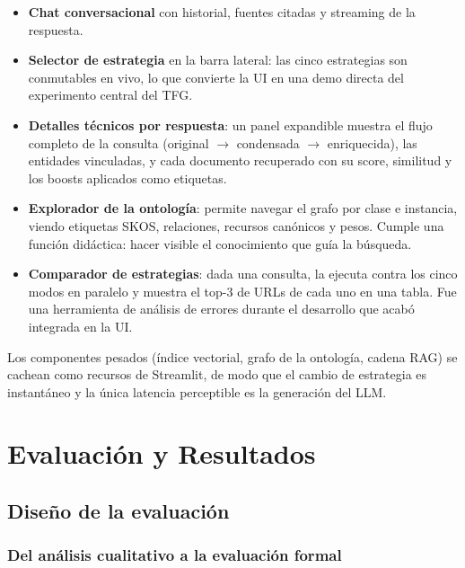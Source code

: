 \documentclass[12pt, a4paper, twoside]{report}
\begin{document}
\begin{itemize}
  \item \textbf{Chat conversacional} con historial, fuentes citadas y streaming de la respuesta.
  \item \textbf{Selector de estrategia} en la barra lateral: las cinco estrategias son conmutables en vivo, lo que convierte la UI en una demo directa del experimento central del TFG.
  \item \textbf{Detalles t\'ecnicos por respuesta}: un panel expandible muestra el flujo completo de la consulta (original $\rightarrow$ condensada $\rightarrow$ enriquecida), las entidades vinculadas, y cada documento recuperado con su score, similitud y los boosts aplicados como etiquetas.
  \item \textbf{Explorador de la ontolog\'ia}: permite navegar el grafo por clase e instancia, viendo etiquetas SKOS, relaciones, recursos can\'onicos y pesos. Cumple una funci\'on did\'actica: hacer visible el conocimiento que gu\'ia la b\'usqueda.
  \item \textbf{Comparador de estrategias}: dada una consulta, la ejecuta contra los cinco modos en paralelo y muestra el top-3 de URLs de cada uno en una tabla. Fue una herramienta de an\'alisis de errores durante el desarrollo que acab\'o integrada en la UI.
\end{itemize}

Los componentes pesados (\'indice vectorial, grafo de la ontolog\'ia, cadena RAG) se cachean como recursos de Streamlit, de modo que el cambio de estrategia es instant\'aneo y la \'unica latencia perceptible es la generaci\'on del LLM.

\chapter{Evaluaci\'on y Resultados}
\label{ch:evaluacion}

\section{Dise\~no de la evaluaci\'on}

\subsection{Del an\'alisis cualitativo a la evaluaci\'on formal}
\end{document}
